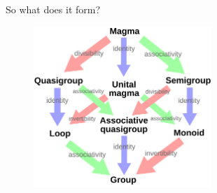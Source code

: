 \documentclass{beamer}
\begin{document}

\begin{frame}{So what does it form?}
    \begin{figure}
        \includegraphics[width=0.6\textwidth]{algebraic_structures.png}
        \label{fig:algebraic-structures}
    \end{figure}
\end{frame}
\end{document}
